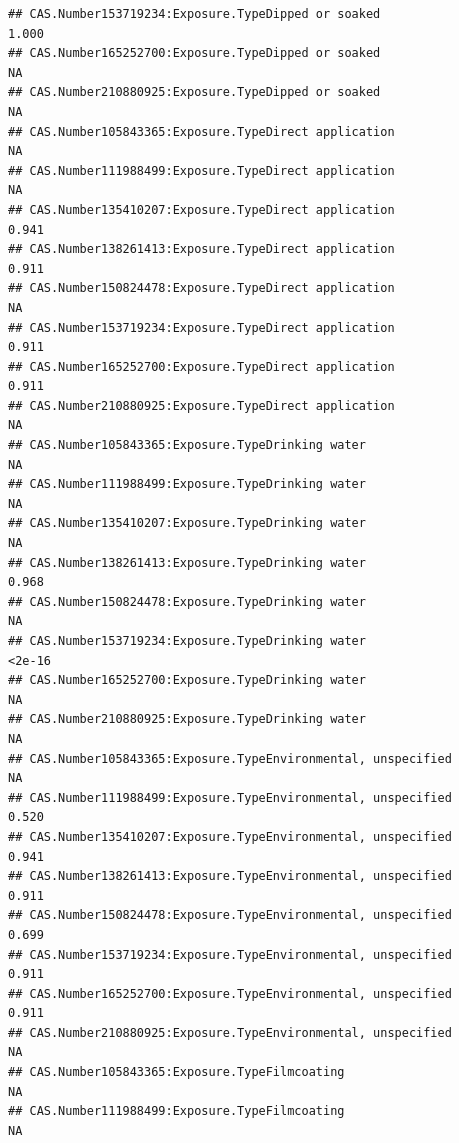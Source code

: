 \documentclass[
  12pt,
]{article}
\begin{document}
\begin{verbatim}
## CAS.Number153719234:Exposure.TypeDipped or soaked                                  1.000
## CAS.Number165252700:Exposure.TypeDipped or soaked                                     NA
## CAS.Number210880925:Exposure.TypeDipped or soaked                                     NA
## CAS.Number105843365:Exposure.TypeDirect application                                   NA
## CAS.Number111988499:Exposure.TypeDirect application                                   NA
## CAS.Number135410207:Exposure.TypeDirect application                                0.941
## CAS.Number138261413:Exposure.TypeDirect application                                0.911
## CAS.Number150824478:Exposure.TypeDirect application                                   NA
## CAS.Number153719234:Exposure.TypeDirect application                                0.911
## CAS.Number165252700:Exposure.TypeDirect application                                0.911
## CAS.Number210880925:Exposure.TypeDirect application                                   NA
## CAS.Number105843365:Exposure.TypeDrinking water                                       NA
## CAS.Number111988499:Exposure.TypeDrinking water                                       NA
## CAS.Number135410207:Exposure.TypeDrinking water                                       NA
## CAS.Number138261413:Exposure.TypeDrinking water                                    0.968
## CAS.Number150824478:Exposure.TypeDrinking water                                       NA
## CAS.Number153719234:Exposure.TypeDrinking water                                   <2e-16
## CAS.Number165252700:Exposure.TypeDrinking water                                       NA
## CAS.Number210880925:Exposure.TypeDrinking water                                       NA
## CAS.Number105843365:Exposure.TypeEnvironmental, unspecified                           NA
## CAS.Number111988499:Exposure.TypeEnvironmental, unspecified                        0.520
## CAS.Number135410207:Exposure.TypeEnvironmental, unspecified                        0.941
## CAS.Number138261413:Exposure.TypeEnvironmental, unspecified                        0.911
## CAS.Number150824478:Exposure.TypeEnvironmental, unspecified                        0.699
## CAS.Number153719234:Exposure.TypeEnvironmental, unspecified                        0.911
## CAS.Number165252700:Exposure.TypeEnvironmental, unspecified                        0.911
## CAS.Number210880925:Exposure.TypeEnvironmental, unspecified                           NA
## CAS.Number105843365:Exposure.TypeFilmcoating                                          NA
## CAS.Number111988499:Exposure.TypeFilmcoating                                          NA

\end{verbatim}
\end{document}
